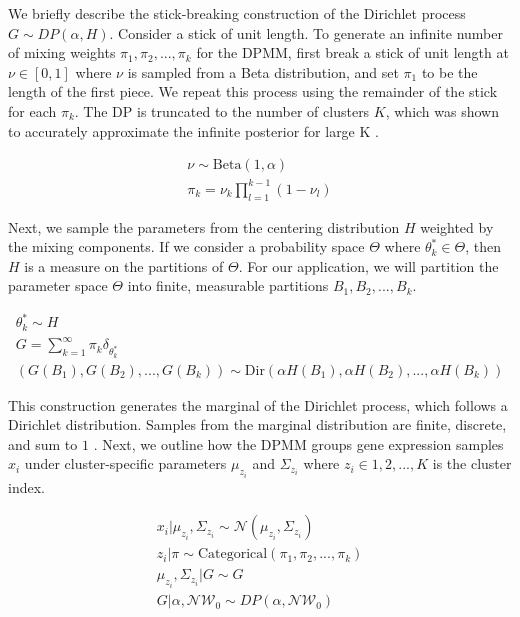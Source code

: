 \documentclass[10pt,letterpaper]{article}
\begin{document}
We briefly describe the stick-breaking construction of the Dirichlet process $G \sim DP(\alpha, H)$. Consider a stick of unit length. To generate an infinite number of mixing weights $\pi_1, \pi_2, ..., \pi_k$ for the DPMM, first break a stick of unit length at $\nu \in [0, 1]$ where $\nu$ is sampled from a Beta distribution, and set $\pi_1$ to be the length of the first piece. We repeat this process using the remainder of the stick for each $\pi_k$. The DP is truncated to the number of clusters $K$, which was shown to accurately approximate the infinite posterior for large K \cite{hughes2013memoized, teh2010dirichlet, gelmanBayesianDataAnalysis2013, fergusonBayesianAnalysisNonparametric1973, mullerBayesianNonparametricData2015, phadia2015prior}.

\begin{gather}
\label{eq:dp}
\nu \sim \text{Beta}(1, \alpha) \\
\pi_k = \nu_k \prod_{l=1}^{k-1}(1 - \nu_l)
\end{gather}

Next, we sample the parameters from the centering distribution $H$ weighted by the mixing components. If we consider a probability space $\Theta$ where $\theta_k^{*} \in \Theta$, then $H$ is a measure on the partitions of $\Theta$. For our application, we will partition the parameter space $\Theta$ into finite, measurable partitions $B_1, B_2, ..., B_k$.

\begin{gather}
\theta_k^{*} \sim H \\
G = \sum_{k=1}^{\infty} \pi_k \delta_{\theta_k^{*}} \\
(G(B_1), G(B_2), ..., G(B_k)) \sim \text{Dir}(\alpha H(B_1), \alpha H(B_2), ..., \alpha H(B_k))
\end{gather}

This construction generates the marginal of the Dirichlet process, which follows a Dirichlet distribution. Samples from the marginal distribution are finite, discrete, and sum to $1$ \cite{fergusonBayesianAnalysisNonparametric1973}. Next, we outline how the DPMM groups gene expression samples $x_i$ under cluster-specific parameters $\mu_{z_i}$ and $\Sigma_{z_i}$ where $z_i \in {1, 2, ..., K}$ is the cluster index.

\begin{gather}
\label{eq:mm}
x_i | \mu_{z_i}, \Sigma_{z_i} \sim \mathcal{N}(\mu_{z_i}, \Sigma_{z_i}) \\
z_i | \pi \sim \text{Categorical}(\pi_1, \pi_2, ..., \pi_k) \\
\mu_{z_i}, \Sigma_{z_i} | G \sim G \\
G | \alpha, \mathcal{NW}_0 \sim DP(\alpha, \mathcal{NW}_0)
\end{gather}
\end{document}
